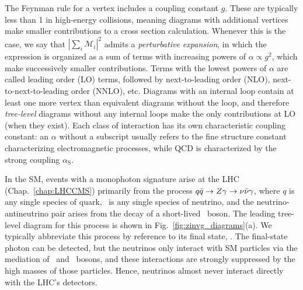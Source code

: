\documentclass[oneside, letterpaper, 12pt, oldfontcommands]{memoir}
\begin{document}
The Feynman rule for a vertex includes a coupling constant $g$. These are typically less than 1 in high-energy collisions, meaning diagrams
with additional vertices make smaller contributions to a cross section calculation. Whenever this is the case, we say that
$|\sum_{i}{\mathcal{M}_{i}}|^{2}$ admits a \textit{perturbative expansion}, in which the expression is organized as a sum of terms with increasing powers
of $\alpha \propto g^{2}$, which make successively smaller contributions.
Terms with the lowest powers of $\alpha$ are called leading order (LO) terms, followed by next-to-leading order (NLO), next-to-next-to-leading order (NNLO), etc.
Diagrams with an internal loop contain at least one more vertex than equivalent diagrams without the loop, and therefore \textit{tree-level} diagrams without any internal loops
make the only contributions at LO (when they exist). Each class of interaction has its own characteristic coupling constant:
an $\alpha$ without a subscript usually refers to the fine structure constant characterizing electromagnetic processes, while QCD is characterized by the strong coupling $\alpha_\mathrm{S}$.

In the SM, events with a monophoton signature arise at the LHC (Chap.~\ref{chap:LHCCMS}) primarily from the process $q\bar{q} \to Z\gamma \to \nu\bar{\nu}\gamma$,
where $q$ is any single species of quark, \Pn\ is any single species of neutrino, and the neutrino-antineutrino pair arises from the decay
of a short-lived \PZ\ boson. The leading tree-level diagram for this process is shown in Fig.~\ref{fig:zinvg_diagrams}(a). We typically abbreviate this process by
reference to its final state, \zinvg. The final-state photon can be detected, but the neutrinos only interact with SM particles via the mediation
of \PZ\ and \PW\ bosons, and these interactions are strongly suppressed by the high masses of those particles. Hence, neutrinos almost never interact directly with the LHC's detectors.
\end{document}
